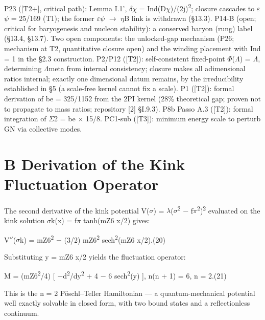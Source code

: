 \documentclass[11pt,letterpaper]{article}
\begin{document}
\noindent P23 ([T2+], critical path): Lemma I.1', $\delta$$\chi$ = Ind(D$\chi$)/(2j)\textsuperscript{2}; closure cascades to $\varepsilon$$\psi$ = 25/169 (T1); the former $\varepsilon$$\psi$ $\to$ $\eta$B link is withdrawn (§13.3). P14-B (open; critical for baryogenesis and nucleon stability): a conserved baryon (rung) label (§13.4, §13.7). Two open components: the unlocked-gap mechanism (P26; mechanism at T2, quantitative closure open) and the winding placement with Ind = 1 in the §2.3 construction. P2/P12 ([T2]): self-consistent fixed-point $\Phi$($\Lambda$) = $\Lambda$, determining $\Lambda$meta from internal consistency; closure makes all adimensional ratios internal; exactly one dimensional datum remains, by the irreducibility established in §5 (a scale-free kernel cannot fix a scale). P1 ([T2]): formal derivation of be = 325/1152 from the 2PI kernel (28\% theoretical gap; proven not to propagate to mass ratios; repository [2] §I.9.3). P8b Passo A.3 ([T2]): formal integration of $\Sigma$2 = be $\times$ 15/8. PC1-sub ([T3]): minimum energy scale to perturb GN via collective modes.

\section*{B  Derivation of the Kink Fluctuation Operator}

\noindent The second derivative of the kink potential V($\sigma$) = $\lambda$($\sigma$\textsuperscript{2} $-$ f$\pi$\textsuperscript{2})\textsuperscript{2} evaluated on the kink solution $\sigma$k(x) = f$\pi$ tanh(mZ6 x/2) gives:

\begingroup\centering V$''$($\sigma$k) = mZ6\textsuperscript{2} $-$ (3/2) mZ6\textsuperscript{2} sech\textsuperscript{2}(mZ6 x/2).\hspace{2em}(20)\par\endgroup

\noindent Substituting y = mZ6 x/2 yields the fluctuation operator:

\begingroup\centering M = (mZ6\textsuperscript{2}/4) [ $-$d\textsuperscript{2}/dy\textsuperscript{2} + 4 $-$ 6 sech\textsuperscript{2}(y) ],   n(n + 1) = 6, n = 2.\hspace{2em}(21)\par\endgroup

\noindent This is the n = 2 Pöschl--Teller Hamiltonian --- a quantum-mechanical potential well exactly solvable in closed form, with two bound states and a reflectionless continuum.
\end{document}
